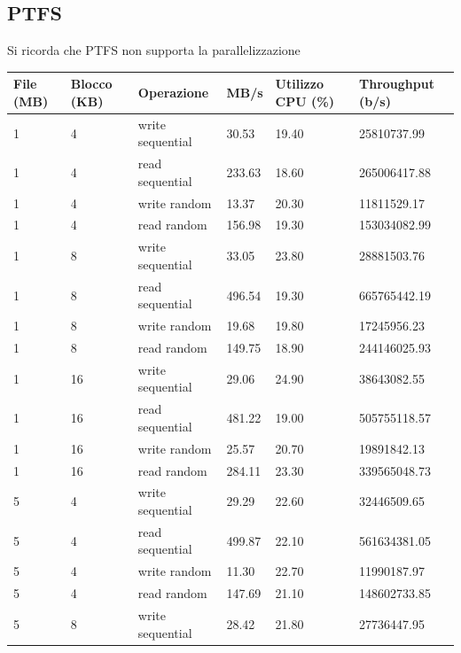 \subsection{PTFS}
Si ricorda che PTFS non supporta la parallelizzazione
\begin{tabularx}{\textwidth}{|X|X|X|X|X|X|}
    \hline
    \textbf{File (MB)} & \textbf{Blocco (KB)} & \textbf{Operazione} & \textbf{MB/s} & \textbf{Utilizzo CPU (\%)} & \textbf{Throughput (b/s)} \\
    \hline
    \endhead
    \rowcolor{lightgray} 1 & 4 & write sequential & 30.53 & 19.40 & 25810737.99 \\
    \hline
    \rowcolor{lightgray} 1 & 4 & read sequential & 233.63 & 18.60 & 265006417.88 \\
    \hline
    \rowcolor{lightgray} 1 & 4 & write random & 13.37 & 20.30 & 11811529.17 \\
    \hline
    \rowcolor{lightgray} 1 & 4 & read random & 156.98 & 19.30 & 153034082.99 \\
    \hline
    \hline
    1 & 8 & write sequential & 33.05 & 23.80 & 28881503.76 \\
    \hline
    1 & 8 & read sequential & 496.54 & 19.30 & 665765442.19 \\
    \hline
    1 & 8 & write random & 19.68 & 19.80 & 17245956.23 \\
    \hline
    1 & 8 & read random & 149.75 & 18.90 & 244146025.93 \\
    \hline
    \hline
    \rowcolor{lightgray} 1 & 16 & write sequential & 29.06 & 24.90 & 38643082.55 \\
    \hline
    \rowcolor{lightgray} 1 & 16 & read sequential & 481.22 & 19.00 & 505755118.57 \\
    \hline
    \rowcolor{lightgray} 1 & 16 & write random & 25.57 & 20.70 & 19891842.13 \\
    \hline
    \rowcolor{lightgray} 1 & 16 & read random & 284.11 & 23.30 & 339565048.73 \\
    \hline
    \hline
    5 & 4 & write sequential & 29.29 & 22.60 & 32446509.65 \\
    \hline
    5 & 4 & read sequential & 499.87 & 22.10 & 561634381.05 \\
    \hline
    5 & 4 & write random & 11.30 & 22.70 & 11990187.97 \\
    \hline
    5 & 4 & read random & 147.69 & 21.10 & 148602733.85 \\
    \hline
    \hline
    \rowcolor{lightgray} 5 & 8 & write sequential & 28.42 & 21.80 & 27736447.95 \\

\end{tabularx}
